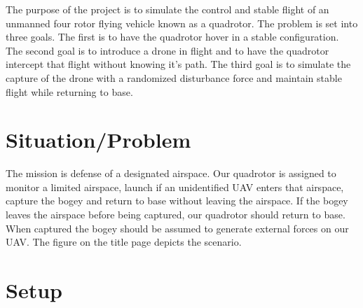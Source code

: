 \documentclass{article}
\begin{document}
The purpose of the project is to simulate the control and stable flight of an unmanned four rotor flying vehicle known as a quadrotor.  The problem is set into three goals.  The first is to have the quadrotor hover in a stable configuration.  The second goal is to introduce a drone in flight and to have the quadrotor intercept that flight without knowing it's path.  The third goal is to simulate the capture of the drone with a randomized disturbance force and maintain stable flight while returning to base.

\section*{Situation/Problem}
The mission is defense of a designated airspace.  Our quadrotor is assigned to 
monitor a limited airspace, launch if an unidentified UAV enters that airspace, capture 
the bogey and return to base without leaving the airspace.  If the bogey leaves the 
airspace before being captured, our quadrotor should return to base.  When captured 
the bogey should be assumed to generate external forces on our UAV. The figure on 
the title page depicts the scenario.
\section*{Setup}
\end{document}
